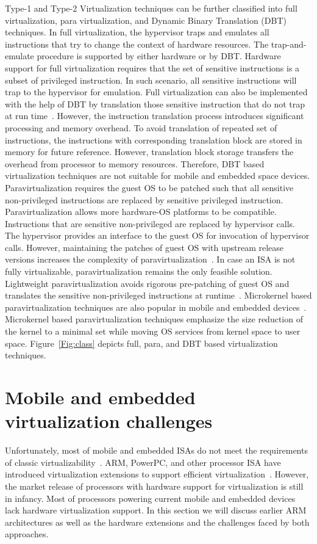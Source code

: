 \documentclass[journal, 10pt]{IEEEtran}
\begin{document}
Type-1 and Type-2 Virtualization techniques can be further classified into full virtualization, para virtualization, and Dynamic Binary Translation (DBT) techniques. In full virtualization, the hypervisor traps and emulates all instructions that try to change the context of hardware resources. The trap-and-emulate procedure is supported by either hardware or by DBT. Hardware support for full virtualization requires that the set of sensitive instructions is a subset of privileged instruction. In such scenario, all sensitive instructions will trap to the hypervisor for emulation. Full virtualization can also be implemented with the help of DBT by translation those sensitive instruction that do not trap at run time~\cite{Gu2012}. However, the instruction translation process introduces significant processing and memory overhead. To avoid translation of repeated set of instructions, the instructions with corresponding translation block are stored in memory for future reference. However, translation block storage transfers the overhead from processor to memory resources. Therefore, DBT based virtualization techniques are not suitable for mobile and embedded space devices. Paravirtualization requires the guest OS to be patched such that all sensitive non-privileged instructions are replaced by sensitive privileged instruction. Paravirtualization allows more hardware-OS platforms to be compatible. Instructions that are sensitive non-privileged are replaced by hypervisor calls. The hypervisor provides an interface to the guest OS for invocation of hypervisor calls. However, maintaining the patches of guest OS with upstream release versions increases the complexity of paravirtualization~\cite{Varanasi2010}. In case an ISA is not fully virtualizable, paravirtualization remains the only feasible solution. Lightweight paravirtualization avoids rigorous pre-patching of guest OS and translates the sensitive non-privileged instructions at runtime~\cite{Dall2010}. Microkernel based paravirtualization techniques are also popular in mobile and embedded devices~\cite{Heiser2010}. Microkernel based paravirtualization techniques emphasize the size reduction of the kernel to a minimal set while moving OS services from kernel space to user space. Figure~\ref{Fig:class} depicts full, para, and DBT based virtualization techniques.

\section{Mobile and embedded virtualization challenges}\label{sec:challenges}
Unfortunately, most of mobile and embedded ISAs do not meet the requirements of classic virtualizability~\cite{Suzuki2013}. ARM, PowerPC, and other processor ISA have introduced virtualization extensions to support efficient virtualization~\cite{Group2010a,Gilles2013}. However, the market release of processors with hardware support for virtualization is still in infancy. Most of processors powering current mobile and embedded devices lack hardware virtualization support. In this section we will discuss earlier ARM architectures as well as the hardware extensions and the challenges faced by both approaches.
\end{document}
